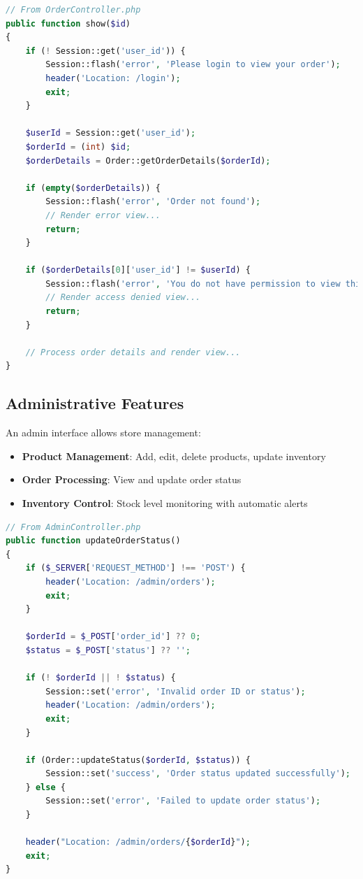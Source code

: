 \documentclass{article}
\begin{document}
\begin{lstlisting}[language=PHP, caption=Order tracking implementation]
// From OrderController.php
public function show($id)
{
    if (! Session::get('user_id')) {
        Session::flash('error', 'Please login to view your order');
        header('Location: /login');
        exit;
    }

    $userId = Session::get('user_id');
    $orderId = (int) $id;
    $orderDetails = Order::getOrderDetails($orderId);

    if (empty($orderDetails)) {
        Session::flash('error', 'Order not found');
        // Render error view...
        return;
    }

    if ($orderDetails[0]['user_id'] != $userId) {
        Session::flash('error', 'You do not have permission to view this order');
        // Render access denied view...
        return;
    }

    // Process order details and render view...
}
\end{lstlisting}

\subsection{Administrative Features}
An admin interface allows store management:
\begin{itemize}
    \item \textbf{Product Management}: Add, edit, delete products, update inventory
    \item \textbf{Order Processing}: View and update order status
    \item \textbf{Inventory Control}: Stock level monitoring with automatic alerts
\end{itemize}

\begin{lstlisting}[language=PHP, caption=Admin order status update]
// From AdminController.php
public function updateOrderStatus()
{
    if ($_SERVER['REQUEST_METHOD'] !== 'POST') {
        header('Location: /admin/orders');
        exit;
    }

    $orderId = $_POST['order_id'] ?? 0;
    $status = $_POST['status'] ?? '';

    if (! $orderId || ! $status) {
        Session::set('error', 'Invalid order ID or status');
        header('Location: /admin/orders');
        exit;
    }

    if (Order::updateStatus($orderId, $status)) {
        Session::set('success', 'Order status updated successfully');
    } else {
        Session::set('error', 'Failed to update order status');
    }

    header("Location: /admin/orders/{$orderId}");
    exit;
}
\end{lstlisting}
\end{document}
